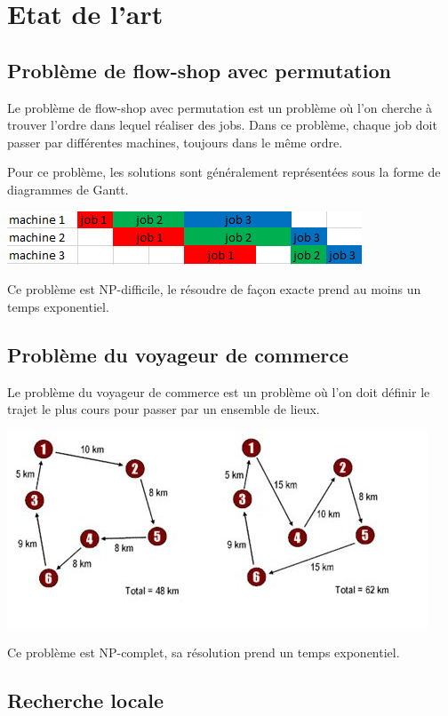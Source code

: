 \chapter{Etat de l'art}

\section{Problème de flow-shop avec permutation}
Le problème de flow-shop avec permutation est un problème où l'on cherche à trouver l'ordre dans lequel réaliser des jobs.
Dans ce problème, chaque job doit passer par différentes machines, toujours dans le même ordre.

Pour ce problème, les solutions sont généralement représentées sous la forme de diagrammes de Gantt.

\includegraphics{parts/etat_de_l_art/gantt_exemple.png}

Ce problème est NP-difficile, le résoudre de façon exacte prend au moins un temps exponentiel.
\section{Problème du voyageur de commerce}
Le problème du voyageur de commerce est un problème où l'on doit définir le trajet le plus cours pour passer par un ensemble de lieux.

\includegraphics[width=\textwidth]{parts/etat_de_l_art/traveling_salesman.jpg}

Ce problème est NP-complet, sa résolution prend un temps exponentiel.

\section{Recherche locale}
\label{section:recherche_locale}

